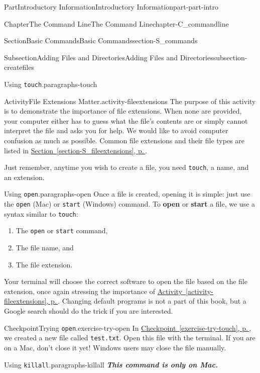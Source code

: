 \documentclass[twoside,10pt,]{book}
\newcommand{\xreffont}{\relax}
\newcommand{\mono}[1]{\texttt{#1}}
\newcommand{\alert}[1]{\textbf{\textit{#1}}}
\newcommand{\terminology}[1]{\textbf{#1}}
\begin{document}
\begin{partptx}{Part}{Introductory Information}{}{Introductory Information}{}{}{part-part-intro}
\begin{chapterptx}{Chapter}{The Command Line}{}{The Command Line}{}{}{chapter-C_commandline}
\begin{sectionptx}{Section}{Basic Commands}{}{Basic Commands}{}{}{section-S_commands}
\begin{subsectionptx}{Subsection}{Adding Files and Directories}{}{Adding Files and Directories}{}{}{subsection-createfiles}
\begin{paragraphs}{Using \mono{touch}.}{paragraphs-touch}
\begin{activity}{Activity}{File Extensions Matter.}{activity-fileextensions}
The purpose of this activity is to demonstrate the importance of file extensions. When none are provided, your computer either has to guess what the file's contents are or simply cannot interpret the file and asks you for help. We would like to avoid computer confusion as much as possible. Common file extensions and their file types are listed in \hyperref[section-S_fileextensions]{Section~{\xreffont\ref{section-S_fileextensions}}, p.\,\pageref{section-S_fileextensions}}.%
\end{activity}%
Just remember, anytime you wish to create a file, you need \mono{touch}, a name, and an extension.%
\end{paragraphs}%
\begin{paragraphs}{Using \mono{open}.}{paragraphs-open}%
\index{\mono{open}}%
\index{\mono{start}}%
%
%
%
Once a file is created, opening it is simple: just use the \mono{open} (Mac) or \mono{start} (Windows) command. To \terminology{open} or \terminology{start} a file, we use a syntax similar to \mono{touch}:%
\begin{enumerate}
\item{}The \mono{open} or \mono{start} command,%
\item{}The file name, and%
\item{}The file extension.%
\end{enumerate}
Your terminal will choose the correct software to open the file based on the file extension, once again stressing the importance of \hyperref[activity-fileextensions]{Activity~{\xreffont\ref{activity-fileextensions}}, p.\,\pageref{activity-fileextensions}}. Changing default programs is not a part of this book, but a Google search should do the trick if you are interested.%
\begin{inlineexercise}{Checkpoint}{Trying \mono{open}.}{exercise-try-open}%
In \hyperref[exercise-try-touch]{Checkpoint~{\xreffont\ref{exercise-try-touch}}, p.\,\pageref{exercise-try-touch}}, we created a new file called \mono{test.txt}. Open this file with the terminal. If you are on a Mac, don't close it yet! Windows users may close the file manually.%
\end{inlineexercise}%
\end{paragraphs}%
\begin{paragraphs}{Using \mono{killall}.}{paragraphs-killall}%
\index{\mono{killall}}%
%
\index{command line!\mono{killall}}%
\alert{This command is only on Mac.}%
\par

\end{paragraphs}
\end{subsectionptx}
\end{sectionptx}
\end{chapterptx}
\end{partptx}
\end{document}
